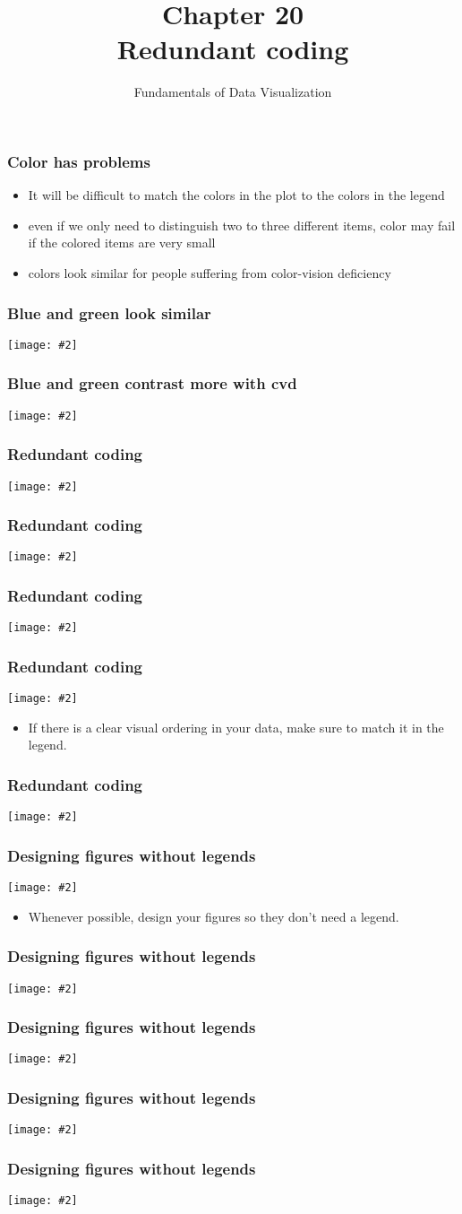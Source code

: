 \documentclass{beamer}
\author{Fundamentals of Data Visualization}
\title{Chapter 20\\Redundant coding}
\newcommand{\bi}{\begin{itemize}}
\newcommand{\li}{\item}
\newcommand{\ei}{\end{itemize}}
\newcommand{\fig}[2]{\centerline{\texttt{[image: \#2]}}}
\newcommand{\bfr}[1]{\begin{frame}[fragile]\frametitle{{ #1 }}}
\begin{document}
\begin{frame}
\maketitle
\end{frame}

\bfr{Color has problems}
\bi
\li It will be difficult to match the colors in the plot to the colors in the legend 
\li even if we only need to distinguish two to three different items, color may fail if the colored items are very small
\li colors look similar for people suffering from color-vision deficiency 
\ei
\end{frame}

\bfr{Blue and green look similar}
\fig{1}{iris-scatter-one-shape-1.png}
\end{frame}


\bfr{Blue and green contrast {\bf more} with cvd}
\fig{1}{iris-scatter-one-shape-cvd-1.png}
\end{frame}

\bfr{Redundant coding}
\fig{1}{iris-scatter-three-shapes-1.png}
\end{frame}



\bfr{Redundant coding}
\fig{1}{iris-scatter-three-shapes-cvd-1.png}
\end{frame}


\bfr{Redundant coding}
\fig{1}{tech-stocks-bad-legend-1.png}
\end{frame}


\bfr{Redundant coding}
\fig{1}{tech-stocks-good-legend-1.png}
\bi
\li If there is a clear visual ordering in your data, make sure to match it in the legend.
\ei
\end{frame}

\bfr{Redundant coding}
\fig{1}{tech-stocks-good-legend-cvd-1.png}

\end{frame}

\bfr{Designing figures without legends}
\fig{1}{tech-stocks-good-no-legend-1.png}
\bi
\li Whenever possible, design your figures so they don’t need a legend.
\ei
\end{frame}

\bfr{Designing figures without legends}
\fig{.8}{iris-scatter-with-ellipses-1.png}
\end{frame}

\bfr{Designing figures without legends}
\fig{1}{iris-densities-direct-label-1.png}
\end{frame}

\bfr{Designing figures without legends}
\fig{.8}{iris-scatter-dens-1.png}
\end{frame}

\bfr{Designing figures without legends}
\fig{1}{temp-ridgeline-colorbar-1.png}
\end{frame}
\end{document}

